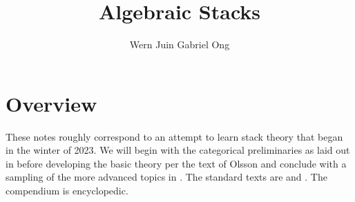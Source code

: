 \documentclass{amsart}
\theoremstyle{definition}
\numberwithin{equation}{section}
\begin{document}
\large
\title[Algebraic Stacks]{Algebraic Stacks}
\author{Wern Juin Gabriel Ong}
\address{Bowdoin College, Brunswick, Maine 04011}
\maketitle
\section*{Overview}
These notes roughly correspond to an attempt to learn stack theory that began in the winter of 2023. We will begin with the categorical preliminaries as laid out in \cite{Vistoli} before developing the basic theory per the text of Olsson \cite{Olsson} and conclude with a sampling of the more advanced topics in \cite[Part 7]{stacks-project}. The standard texts are \cite{LaumonMoret-Bailly} and \cite{Olsson}. The compendium \cite{stacks-project} is encyclopedic. 
\tableofcontents
\newpage



%

%
%









\printbibliography
\end{document}
